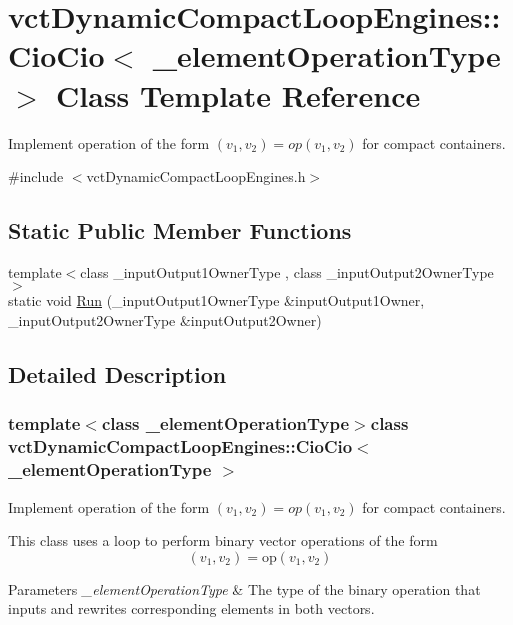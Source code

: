 \hypertarget{classvct_dynamic_compact_loop_engines_1_1_cio_cio}{\section{vct\-Dynamic\-Compact\-Loop\-Engines\-:\-:Cio\-Cio$<$ \-\_\-element\-Operation\-Type $>$ Class Template Reference}
\label{classvct_dynamic_compact_loop_engines_1_1_cio_cio}
}


Implement operation of the form $(v_{1}, v_{2}) = op(v_{1}, v_{2})$ for compact containers.  




{\ttfamily \#include $<$vct\-Dynamic\-Compact\-Loop\-Engines.\-h$>$}

\subsection*{Static Public Member Functions}
\begin{DoxyCompactItemize}
\item 
{\footnotesize template$<$class \-\_\-input\-Output1\-Owner\-Type , class \-\_\-input\-Output2\-Owner\-Type $>$ }\\static void \hyperlink{classvct_dynamic_compact_loop_engines_1_1_cio_cio_a3b40ac822d54540352aaa259fe00bf7e}{Run} (\-\_\-input\-Output1\-Owner\-Type \&input\-Output1\-Owner, \-\_\-input\-Output2\-Owner\-Type \&input\-Output2\-Owner)
\end{DoxyCompactItemize}


\subsection{Detailed Description}
\subsubsection*{template$<$class \-\_\-element\-Operation\-Type$>$class vct\-Dynamic\-Compact\-Loop\-Engines\-::\-Cio\-Cio$<$ \-\_\-element\-Operation\-Type $>$}

Implement operation of the form $(v_{1}, v_{2}) = op(v_{1}, v_{2})$ for compact containers. 

This class uses a loop to perform binary vector operations of the form \[ (v_{1}, v_{2}) = \mathrm{op}(v_{1}, v_{2}) \]


\begin{DoxyParams}{Parameters}
{\em \-\_\-element\-Operation\-Type} & The type of the binary operation that inputs and rewrites corresponding elements in both vectors. \\
\hline
\end{DoxyParams}


